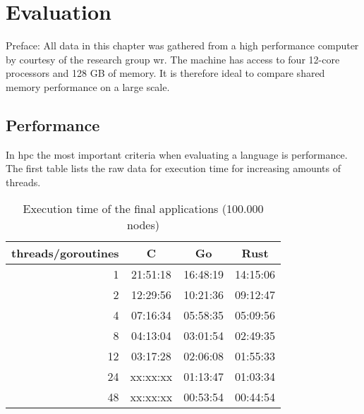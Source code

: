 \chapter{Evaluation}
\label{ch:Evaluation}


Preface: All data in this chapter was gathered from a high performance computer by courtesy of the research group \gls{wr}. The machine has access to four 12-core processors and 128 GB of memory. It is therefore ideal to compare shared memory performance on a large scale.

\section{Performance}
\label{sec:Evaluaton::Performance}

In \acrlong{hpc} the most important criteria when evaluating a language is performance. The first table lists the raw data for execution time for increasing amounts of threads.

\begin{table}[htb]
    \centering
    \begin{tabular}{rccc}
        \toprule
            threads/goroutines
            & C
            & Go
            & Rust \\
        \midrule

            1
            & 21:51:18
            & 16:48:19
            & 14:15:06 \\

            2
            & 12:29:56
            & 10:21:36
            & 09:12:47 \\

            4
            & 07:16:34
            & 05:58:35
            & 05:09:56 \\

            8
            & 04:13:04
            & 03:01:54
            & 02:49:35 \\

            12
            & 03:17:28
            & 02:06:08
            & 01:55:33 \\

            24
            & xx:xx:xx
            & 01:13:47
            & 01:03:34 \\

            48
            & xx:xx:xx
            & 00:53:54
            & 00:44:54 \\

        \bottomrule
    \end{tabular}
    \caption{Execution time of the final applications (100.000 nodes)}
    \label{tb:final_execution_time}
\end{table}

